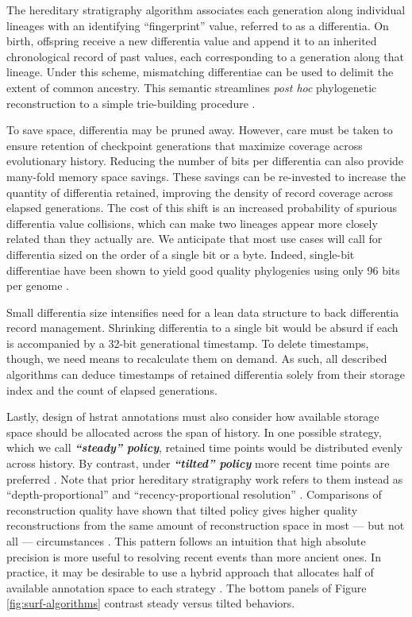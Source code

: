 The hereditary stratigraphy algorithm associates each generation along individual lineages with an identifying ``fingerprint'' value, referred to as a differentia.
On birth, offspring receive a new differentia value and append it to an inherited chronological record of past values, each corresponding to a generation along that lineage.
Under this scheme, mismatching differentiae can be used to delimit the extent of common ancestry.
This semantic streamlines \textit{post hoc} phylogenetic reconstruction to a simple trie-building procedure
\citep{moreno2024analysis}.

To save space, differentia may be pruned away.
However, care must be taken to ensure retention of checkpoint generations that maximize coverage across evolutionary history.
Reducing the number of bits per differentia can also provide many-fold memory space savings.
These savings can be re-invested to increase the quantity of differentia retained, improving the density of record coverage across elapsed generations.
The cost of this shift is an increased probability of spurious differentia value collisions, which can make two lineages appear more closely related than they actually are.
We anticipate that most use cases will call for differentia sized on the order of a single bit or a byte.
Indeed, single-bit differentiae have been shown to yield good quality phylogenies using only 96 bits per genome \citep{moreno2024guide}.

Small differentia size intensifies need for a lean data structure to back differentia record management.
Shrinking differentia to a single bit would be absurd if each is accompanied by a 32-bit generational timestamp.
To delete timestamps, though, we need means to recalculate them on demand.
As such, all described algorithms can deduce timestamps of retained differentia solely from their storage index and the count of elapsed generations.

Lastly, design of hstrat annotations must also consider how available storage space should be allocated across the span of history.
In one possible strategy, which we call \textit{\textbf{``steady'' policy}}, retained time points would be distributed evenly across history.
By contrast, under \textit{\textbf{``tilted'' policy}} more recent time points are preferred \citep{han2005stream,zhao2005generalized}.
Note that prior hereditary stratigraphy work refers to them instead as ``depth-proportional'' and ``recency-proportional resolution'' \citep{moreno2022hereditary}.
Comparisons of reconstruction quality have shown that tilted policy gives higher quality reconstructions from the same amount of reconstruction space in most --- but not all --- circumstances \citep{moreno2024guide}.
This pattern follows an intuition that high absolute precision is more useful to resolving recent events than more ancient ones.
In practice, it may be desirable to use a hybrid approach that allocates half of available annotation space to each strategy \citep{moreno2024guide}.
The bottom panels of Figure \ref{fig:surf-algorithms} contrast steady versus tilted behaviors.

